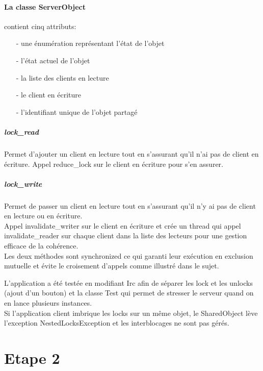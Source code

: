 \documentclass[a4paper,12pt]{article}
\begin{document}
\bigskip

\paragraph{La classe ServerObject}

 contient cinq attributs:
\begin{itemize}
\item[- une énumération représentant l'état de l'objet]
\item[- l'état actuel de l'objet]
\item[- la liste des clients en lecture]
\item[- le client en écriture]
\item[- l'identifiant unique de l'objet partagé]
\end{itemize}

\smallskip
\subparagraph{lock\_read}
Permet d'ajouter un client en lecture tout en s'assurant qu'il n'ai pas de client en écriture. Appel reduce\_lock sur le client en écriture pour s'en assurer.
\subparagraph{lock\_write}
Permet de passer un client en lecture tout en s'assurant qu'il n'y ai pas de client en lecture ou en écriture.\\
Appel invalidate\_writer sur le client en écriture et crée un thread qui appel invalidate\_reader sur chaque client dans la liste des lecteurs pour une gestion efficace de la cohérence.\\

Les deux méthodes sont synchronized ce qui garanti leur exécution en exclusion mutuelle et évite le croisement d'appels comme illustré dans le sujet.\\

\bigskip
\bigskip

L'application a été testée en modifiant Irc afin de séparer les lock et les unlocks (ajout d'un bouton) et la classe Test qui permet de stresser le serveur quand on en lance plusieurs instances. \\
Si l'application client imbrique les locks sur un même objet, le SharedObject lève l'exception NestedLocksException et les interblocages ne sont pas gérés.\\



\clearpage
\section{Etape 2}

\bigskip
\bigskip
\end{document}
